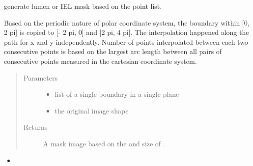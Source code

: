 \documentclass[letterpaper,10pt,english]{sphinxmanual}
\begin{document}
\begin{fulllineitems}
\label{\detokenize{index:util.read_oct_roi_file.lumen_iel_mask}}
generate lumen or IEL mask based on the point list.

Based on the periodic nature of polar coordinate system, the boundary within {[}0, 2 pi{]} is copied to {[}- 2 pi, 0{]} and
{[}2 pi, 4 pi{]}. The interpolation happened along the path for x and y independently. Number of points interpolated
between each two consecutive points is based on the largest arc length between all pairs of consecutive points
measured in the cartesian coordinate system.
\begin{quote}\begin{description}
\item[{Parameters}] \leavevmode\begin{itemize}
\item {} 
 \textendash{} list of a single boundary in a single plane

\item {} 
 \textendash{} the original image shape

\end{itemize}

\item[{Returns}] \leavevmode
A mask image based on the  and size of .

\end{description}\end{quote}



\begin{itemize}
\item {} 
{\hyperref[\detokenize{index:util.read_oct_roi_file.read_oct_roi_file}]{}}

\end{itemize}



\end{fulllineitems}

\end{document}
